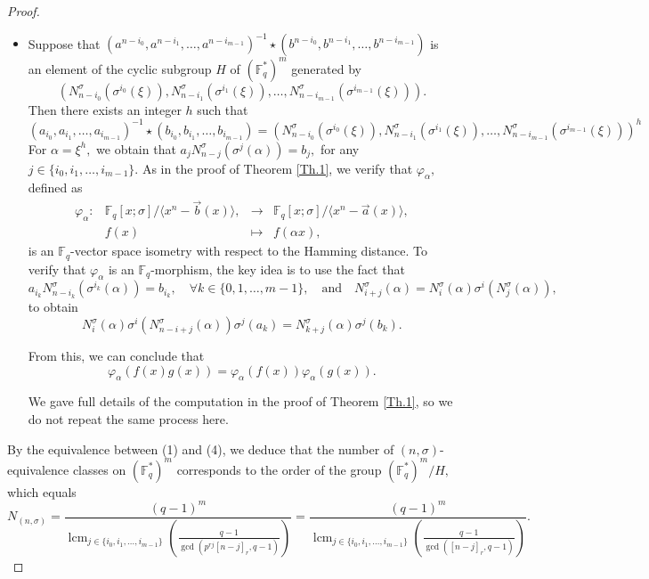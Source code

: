 \documentclass[12pt,paper]{article}
\theoremstyle{plain}
\newcommand{\Fq}{\mathbb{F}_{q}}
\DeclareMathOperator{\lcm}{lcm}
\begin{document}
\begin{proof}
\begin{itemize}
    \item[(4) $\Rightarrow$ (1):]  
     Suppose that $ (a^{n-{i_0}}, a^{n-{i_1}} , \ldots, a^{n-i_{m-1}})^{-1}\star (b^{n-{i_0}}, b^{n-{i_1}} , \ldots, b^{n-i_{m-1}}) $ is an element of the cyclic subgroup  $H$ of $ (\Fq^{*})^m$ generated by
$$ \left( N_{n-i_0}^{\sigma}(\sigma^{i_0}(\xi)), 
N^{\sigma}_{n-i_1}(\sigma^{i_1}(\xi)), \ldots, N^{\sigma}_{n-i_{m-1}}(\sigma^{i_{m-1}}(\xi))\right) .$$
Then there exists an integer $ h$ such that 
     $$  ( a_{i_0},  a_{i_1}, \ldots, a_{i_{m-1}})^{-1}\star ( b_{i_0},  b_{i_1}, \ldots, b_{i_{m-1}}) =  \left( N_{n-i_0}^{\sigma}(\sigma^{i_0}(\xi)), 
N^{\sigma}_{n-i_1}(\sigma^{i_1}(\xi)), \ldots, N^{\sigma}_{n-i_{m-1}}(\sigma^{i_{m-1}}(\xi))\right)^h $$
    For $ \alpha= \xi^{h}, $ we obtain  that $  a_j N_{n-j}^{\sigma}(\sigma^j(\alpha))= b_j, $ for any $ j\in \{ i_0,i_1,\ldots, i_{m-1}\}.$
As in the proof of Theorem \ref{Th.1}, we verify that  $ \varphi_{\alpha}, $ defined as  
  \begin{equation}
        \begin{array}{cccc}
        \varphi_{\alpha} : & \Fq[x;\sigma]/\langle x^n - \vec{b}(x) \rangle,  & \longrightarrow & \Fq[x;\sigma] /\langle x^n - \vec{a}(x) \rangle, \\ 
        & f(x) & \longmapsto & f(\alpha x),
        \end{array}
    \end{equation} 
    is an $\Fq$-vector space  isometry with respect to the Hamming distance.
To verify that $\varphi_{\alpha}$ is an $\mathbb{F}_q$-morphism, the key idea is to use the fact that  
$$ 
a_{i_k} N^{\sigma}_{n-i_k}(\sigma^{i_k}(\alpha)) = b_{i_k}, \quad \forall k \in \{0,1,\ldots,m-1\}, \quad \text{and} \quad N_{i+j}^\sigma(\alpha) = N_i^\sigma(\alpha)\sigma^i(N_j^\sigma(\alpha)),
$$  
to  obtain 
$$ 
N_i^\sigma(\alpha)\sigma^i(N_{n-i+j}^\sigma(\alpha)) \sigma^j(a_{k}) = N^{\sigma}_{k+j}(\alpha) \sigma^{j}(b_{k}).
$$  

From this, we can conclude that  
$$ 
\varphi_{\alpha}(f(x)g(x)) = \varphi_{\alpha}(f(x))\varphi_{\alpha}(g(x)).
$$  

We gave full details of the computation in the proof of Theorem \ref{Th.1},  so we do  not repeat the same process here.
\end{itemize}

\noindent By the equivalence between (1) and (4), we deduce that the number of $(n,\sigma)$-equivalence classes  on $(\Fq^*)^m$ corresponds to the order of the group $ (\Fq^*)^m/H,$ which equals 
$$ N_{(n,\sigma)}=\dfrac{ (q-1)^m}{ \lcm_{ j\in \{i_0,i_1,\ldots, i_{m-1} \} }\left(\frac{q-1}{ \gcd(p^{r j}[n-j]_r,q-1)}\right)}=\dfrac{ (q-1)^m}{ \lcm_{ j\in \{i_0,i_1,\ldots, i_{m-1} \} }\left(\frac{q-1}{ \gcd([n-j]_r,q-1)}\right)}. $$ 


\end{proof}
\end{document}
